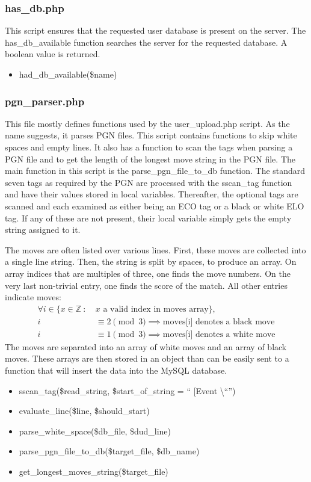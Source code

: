 \documentclass{article}
\begin{document}
\subsubsection{has\_db.php}
This script ensures that the requested user database is present on the server.
The has\_db\_available function searches the server for the requested database.
A boolean value is returned.
\begin{itemize}
	\item had\_db\_available(\$name)
\end{itemize}

\subsubsection{pgn\_parser.php}
This file mostly defines functions used by the user\_upload.php script.
As the name suggests, it parses PGN files. This script contains functions to
skip white spaces and empty lines. It also has a function to scan the tags
when parsing a PGN file and to get the length of the longest move string in
the PGN file. The main function in this script is the parse\_pgn\_file\_to\_db
function. The standard seven tags as required by the PGN are processed with
the sscan\_tag function and have their values stored in local variables.
Thereafter, the optional tags are scanned and each examined as either being
an ECO tag or a black or white ELO tag.  If any of these are not present,
their local variable simply gets the empty string assigned to it.

The moves are often listed over various lines.  First, these moves are
collected into a single line string.  Then, the string is split by spaces,
to produce an array.  On array indices that are multiples of three, one
finds the move numbers.  On the very last non-trivial entry, one finds
the score of the match.  All other entries indicate moves:
\begin{align*}
\forall i \in \{ x\in \mathbb{Z}\ :\ & x\text{ a valid index in moves array}\},\\
i & \equiv 2\pmod 3 \implies \text{moves[i] denotes a black move}\\
i & \equiv 1\pmod 3 \implies \text{moves[i] denotes a white move}
\end{align*}
The moves are separated into an array of white moves and an array of black
moves. These arrays are then stored in an object than can be easily sent to
a function that will insert the data into the MySQL database.

\begin{itemize}
	\item sscan\_tag(\$read\_string, \$start\_of\_string = \textquotedblleft
	[Event \textbackslash \textquotedblleft\textquotedblright )
	\item evaluate\_line(\$line, \$should\_start)
	\item parse\_white\_space(\$db\_file, \$dud\_line)
	\item parse\_pgn\_file\_to\_db(\$target\_file, \$db\_name)
	\item get\_longest\_moves\_string(\$target\_file)
\end{itemize}
\end{document}
